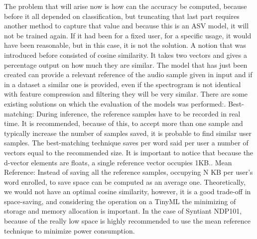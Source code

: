 The problem that will arise now is how can the accuracy be computed, because before it all depended on classification, but truncating that last part requires another method to capture that value and because this is an ASV model, it will not be trained again. If it had been for a fixed user, for a specific usage, it would have been reasonable, but in this case, it is not the solution. A notion that was introduced before consisted of cosine similarity. It takes two vectors and gives a percentage output on how much they are similar. The model that has just been created can provide a relevant reference of the audio sample given in input and if in a dataset a similar one is provided, even if the spectrogram is not identical with feature compression and filtering they will be very similar. There are some existing solutions on which the evaluation of the models was performed:. Best-matching: During inference, the reference samples have to be recorded in real time. It is recommended, because of this, to accept more than one sample and typically increase the number of samples saved, it is probable to find similar user samples. The best-matching technique saves per word said per user a number of vectors equal to the recommended size. It is important to notice that because the d-vector elements are floats, a single reference vector occupies 1KB.. Mean Reference: Instead of saving all the reference samples, occupying N KB per user's word enrolled, to save space can be computed as an average one. Theoretically, we would not have an optimal cosine similarity, however, it is a good trade-off in space-saving, and considering the operation on a TinyML the minimizing of storage and memory allocation is important.\newline
In the case of Syntiant NDP101, because of the really low space is highly recommended to use the mean reference technique to minimize power consumption.
